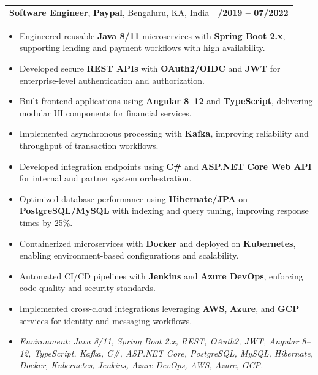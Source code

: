 \documentclass[letterpaper,11pt]{article}
\makeatletter
\newcommand{\resumeItem}[1]{
  \item\footnotesize{
    {#1 \vspace{-2pt}}
  }
}
\newcommand{\resumeSubheading}[4]{
  \vspace{-2pt}\item
    \begin{tabular*}{1.0\textwidth}[t]{l@{\extracolsep{\fill}}r}
      \textbf{\fontsize{10pt}{14pt}\selectfont #3}, \textbf{\fontsize{10pt}{14pt}\selectfont #1}, \fontsize{10pt}{14pt}\selectfont #4 & \textbf{\fontsize{10pt}{14pt}\selectfont #2} \\
    \end{tabular*}\vspace{-7pt}
}
\newcommand{\resumeItemListStart}{\begin{itemize}[leftmargin=*]}
\newcommand{\resumeItemListEnd}{\end{itemize}\vspace{-5pt}}
\makeatother
\begin{document}
\resumeSubheading
{Paypal}{08/2019 -- 07/2022}
{Software Engineer}{Bengaluru, KA, India}
\resumeItemListStart
  \resumeItem{Engineered reusable \textbf{Java 8/11} microservices with \textbf{Spring Boot 2.x}, supporting lending and payment workflows with high availability.}
  \resumeItem{Developed secure \textbf{REST APIs} with \textbf{OAuth2/OIDC} and \textbf{JWT} for enterprise-level authentication and authorization.}
  \resumeItem{Built frontend applications using \textbf{Angular 8--12} and \textbf{TypeScript}, delivering modular UI components for financial services.}
  \resumeItem{Implemented asynchronous processing with \textbf{Kafka}, improving reliability and throughput of transaction workflows.}
  \resumeItem{Developed integration endpoints using \textbf{C\#} and \textbf{ASP.NET Core Web API} for internal and partner system orchestration.}
  \resumeItem{Optimized database performance using \textbf{Hibernate/JPA} on \textbf{PostgreSQL/MySQL} with indexing and query tuning, improving response times by 25\%.}
  \resumeItem{Containerized microservices with \textbf{Docker} and deployed on \textbf{Kubernetes}, enabling environment-based configurations and scalability.}
  \resumeItem{Automated CI/CD pipelines with \textbf{Jenkins} and \textbf{Azure DevOps}, enforcing code quality and security standards.}
  \resumeItem{Implemented cross-cloud integrations leveraging \textbf{AWS}, \textbf{Azure}, and \textbf{GCP} services for identity and messaging workflows.}
  \resumeItem{\textit{Environment: Java 8/11, Spring Boot 2.x, REST, OAuth2, JWT, Angular 8--12, TypeScript, Kafka, C\#, ASP.NET Core, PostgreSQL, MySQL, Hibernate, Docker, Kubernetes, Jenkins, Azure DevOps, AWS, Azure, GCP.}}
\resumeItemListEnd
\end{document}
